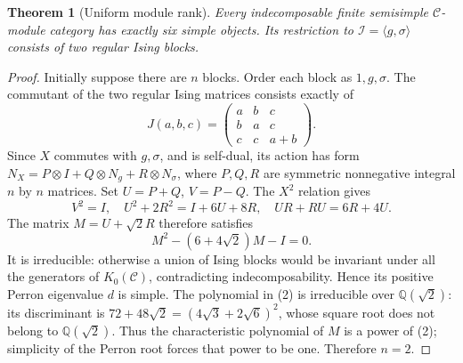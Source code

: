 \documentclass[11pt]{article}
\newtheorem{theorem}{Theorem}\newtheorem{lemma}{Lemma}\newtheorem{corollary}{Corollary}
\newcommand{\C}{\mathcal C}\newcommand{\I}{\mathcal I}\newcommand{\M}{\mathcal M}
\begin{document}
\begin{theorem}[Uniform module rank]
Every indecomposable finite semisimple $\C$-module category has exactly
six simple objects. Its restriction to $\I=\langle g,\sigma\rangle$
consists of two regular Ising blocks.
\end{theorem}
\begin{proof}
Initially suppose there are $n$ blocks. Order each block as $1,g,\sigma$.
The commutant of the two regular Ising matrices consists exactly of
\[
J(a,b,c)=\begin{pmatrix}a&b&c\\b&a&c\\c&c&a+b\end{pmatrix}.
\]
Since $X$ commutes with $g,\sigma$, and is self-dual, its action has form
$N_X=P\otimes I+Q\otimes N_g+R\otimes N_\sigma$,
where $P,Q,R$ are symmetric nonnegative integral $n$ by $n$ matrices.
Set $U=P+Q$, $V=P-Q$. The $X^2$ relation gives
\[
V^2=I,\quad U^2+2R^2=I+6U+8R,\quad UR+RU=6R+4U. \tag{1}
\]
The matrix $M=U+\sqrt2R$ therefore satisfies
\[
M^2-(6+4\sqrt2)M-I=0. \tag{2}
\]
It is irreducible: otherwise a union of Ising blocks would be invariant
under all the generators of $K_0(\C)$, contradicting indecomposability.
Hence its positive Perron eigenvalue $d$ is simple. The polynomial in
(2) is irreducible over $\mathbb Q(\sqrt2)$: its discriminant is
$72+48\sqrt2=(4\sqrt3+2\sqrt6)^2$, whose square root does not belong
to $\mathbb Q(\sqrt2)$. Thus the characteristic polynomial of $M$ is a
power of (2); simplicity of the Perron root forces that power to be one.
Therefore $n=2$.
\end{proof}
\end{document}

